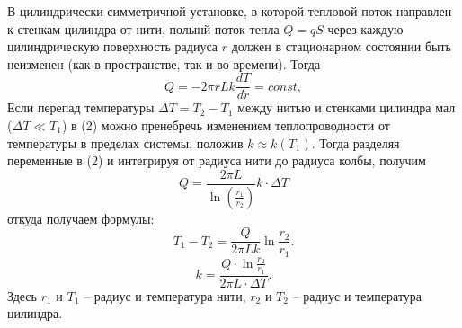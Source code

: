\documentclass[12pt,a4paper]{article}
\begin{document}
	В цилиндрически симметричной установке, в которой тепловой поток направлен к стенкам цилиндра от нити, полынй поток тепла $Q = qS$ через каждую цилиндрическую поверхность радиуса $r$ должен в стационарном состоянии быть неизменен (как в пространстве, так и во времени). Тогда
\begin{equation}
	Q = -2\pi rLk \frac{dT}{dr} = const,	
\end{equation}
Если перепад температуры $ \Delta T =T_2-T_1$ между нитью и стенками цилиндра мал ($ \Delta T\ll T_1 $) в (2) можно пренебречь изменением теплопроводности от температуры в пределах системы, положив $k\approx k(T_1)$. Тогда разделяя переменные в (2) и интегрируя от радиуса нити до радиуса колбы, получим
\begin{equation}
Q=\frac{2\pi L}{\ln(\frac{r_1}{r_2})}k\cdot\Delta T
\end{equation}
откуда получаем формулы:
\begin{equation}
	\label{formula}
	T_1 - T_2 = \frac{Q}{2\pi Lk} \ln \frac{r_2}{r_1}.
\end{equation}
\begin{equation}
	\label{formula}
	k= \frac{Q\cdot \ln \frac{r_2}{r_1}}{2\pi L\cdot\Delta T}.
\end{equation}
Здесь $r_1$ и $T_1$ -- радиус и температура нити, $r_2$ и $T_2$ -- радиус и температура цилиндра.
\end{document}

